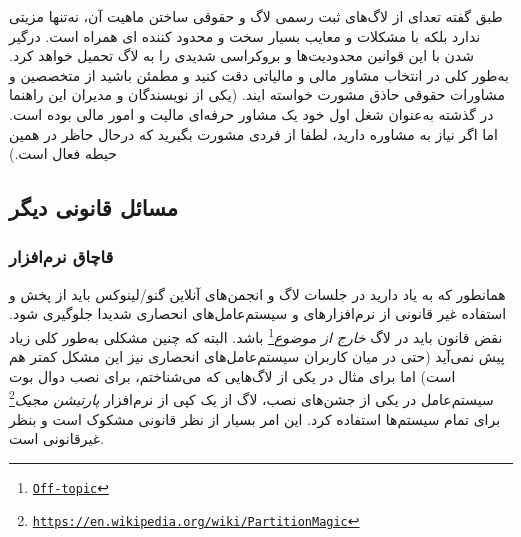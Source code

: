 طبق گفته تعدای از لاگ‌های ثبت رسمی لاگ و حقوقی ساختن ماهیت آن، نه‌تنها مزیتی ندارد بلکه با مشکلات
و معایب بسیار سخت و محدود کننده ای همراه است. درگیر شدن با این قوانین محدودیت‌ها و بروکراسی
شدیدی را به لاگ تحمیل خواهد کرد. به‌طور کلی در انتخاب مشاور مالی و مالیاتی دقت کنید و مطمئن باشید
از متخصصین و مشاورات حقوقی حاذق مشورت خواسته ایند. (یکی از نویسندگان و مدیران این راهنما در گذشته
به‌عنوان شغل اول خود یک مشاور حرفه‌ای مالیت و امور مالی بوده است. اما اگر نیاز به مشاوره دارید، لطفا
از فردی مشورت بگیرید که درحال حاظر در همین حیطه فعال است.)

\subsection{مسائل قانونی دیگر}

\subsubsection{قاچاق نرم‌افزار}
همانطور که به یاد دارید در جلسات لاگ و انجمن‌های آنلاین گنو/لینوکس باید از پخش و استفاده غیر قانونی
از نرم‌افزارهای و سیستم‌عامل‌های انحصاری شدیدا جلوگیری شود. نقض قانون باید در لاگ
\emph{خارج از موضوع}\footnote{\texttt{\url{Off-topic}}}
باشد. البته که چنین مشکلی به‌طور کلی زیاد پیش نمی‌آید (حتی در میان کاربران سیستم‌عامل‌های انحصاری
نیز این مشکل کمتر هم است) اما برای مثال در یکی از لاگ‌هایی که می‌شناختم، برای نصب دوال بوت سیستم‌عامل
در یکی از جشن‌های نصب، لاگ از یک کپی از نرم‌افزار 
\emph{پارتیشن مجیک}\footnote{\texttt{\url{https://en.wikipedia.org/wiki/PartitionMagic}}}
برای تمام سیستم‌ها استفاده کرد. این امر بسیار از نظر قانونی مشکوک است و بنظر غیرقانونی است.

